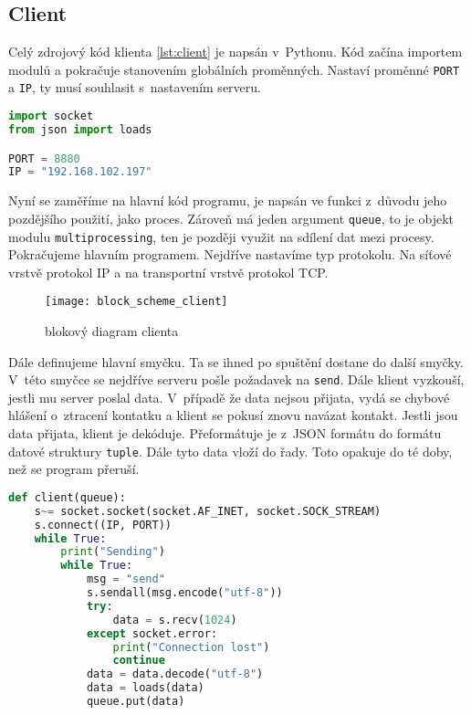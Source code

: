 \documentclass[12pt]{report}			%
\begin{document}
\subsection{Client}

Celý zdrojový kód klienta \ref{lst:client} je napsán v~Pythonu. Kód začína importem modulů a pokračuje stanovením globálních proměnných. Nastaví proměnné \texttt{PORT} a \texttt{IP}, ty musí souhlasit s~nastavením serveru. 
\begin{lstlisting}[title={Program client.py}, caption={client.py}, language=Python]
import socket
from json import loads

PORT = 8880
IP = "192.168.102.197"
\end{lstlisting}

Nyní se zaměříme na hlavní kód programu, je napsán ve funkci z~důvodu jeho pozdějšího použití, jako proces. Zároveň má jeden argument \texttt{queue}, to je objekt modulu \texttt{multiprocessing}, ten je později využit na sdílení dat mezi procesy. Pokračujeme hlavním programem. Nejdříve nastavíme typ protokolu. Na síťové vrstvě protokol IP a na transportní vrstvě protokol TCP. 


\begin{figure}[h]
\caption{blokový diagram clienta}
\centering
 \texttt{[image: block\_scheme\_client]}
\end{figure}

Dále definujeme hlavní smyčku. Ta se ihned po spuštění dostane do další smyčky. V~této smyčce se nejdříve serveru pošle požadavek na \texttt{send}. Dále klient vyzkouší, jestli mu server poslal data. V~případě že data nejsou přijata, vydá se chybové hlášení o~ztracení kontatku a klient se pokusí znovu navázat kontakt. Jestli jsou data přijata, klient je dekóduje. Přeformátuje je z~JSON formátu do formátu datové struktury \texttt{tuple}. Dále tyto data vloží do řady. Toto opakuje do té doby, než se program přeruší. 

\begin{lstlisting}[title={Program client.py}, caption={client.py}, language=Python]
def client(queue):
    s~= socket.socket(socket.AF_INET, socket.SOCK_STREAM)
    s.connect((IP, PORT))
    while True:
        print("Sending")
        while True:
            msg = "send"
            s.sendall(msg.encode("utf-8"))
            try:
                data = s.recv(1024)
            except socket.error:
                print("Connection lost")
                continue
            data = data.decode("utf-8")
            data = loads(data)
            queue.put(data)

\end{lstlisting}
\end{document}
